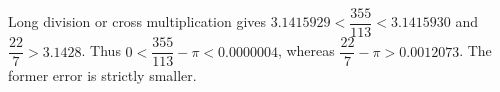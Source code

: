 Long division or cross multiplication gives $3.1415929<\dfrac{355}{113}<3.1415930$ and $\dfrac{22}{7}>3.1428$. Thus $0<\dfrac{355}{113}-\pi<0.0000004$, whereas $\dfrac{22}{7}-\pi>0.0012073$. The former error is strictly smaller.
